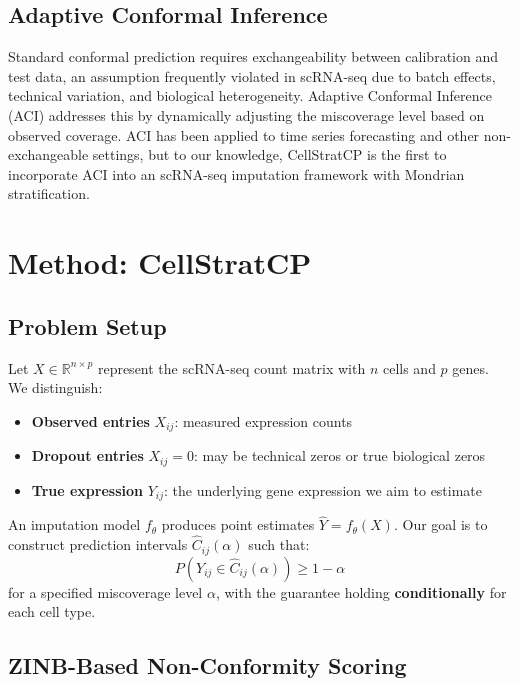 \documentclass{article}
\begin{document}
\subsection{Adaptive Conformal Inference}

Standard conformal prediction requires exchangeability between calibration and test data, an assumption frequently violated in scRNA-seq due to batch effects, technical variation, and biological heterogeneity. Adaptive Conformal Inference (ACI) \citep{gibbs2021adaptive} addresses this by dynamically adjusting the miscoverage level based on observed coverage. ACI has been applied to time series forecasting and other non-exchangeable settings, but to our knowledge, CellStratCP is the first to incorporate ACI into an scRNA-seq imputation framework with Mondrian stratification.

\section{Method: CellStratCP}

\subsection{Problem Setup}

Let $X \in \mathbb{R}^{n \times p}$ represent the scRNA-seq count matrix with $n$ cells and $p$ genes. We distinguish:
\begin{itemize}
    \item \textbf{Observed entries} $X_{ij}$: measured expression counts
    \item \textbf{Dropout entries} $X_{ij} = 0$: may be technical zeros or true biological zeros
    \item \textbf{True expression} $Y_{ij}$: the underlying gene expression we aim to estimate
\end{itemize}

An imputation model $f_\theta$ produces point estimates $\hat{Y} = f_\theta(X)$. Our goal is to construct prediction intervals $\hat{C}_{ij}(\alpha)$ such that:
\begin{equation}
    P(Y_{ij} \in \hat{C}_{ij}(\alpha)) \geq 1 - \alpha
\end{equation}
for a specified miscoverage level $\alpha$, with the guarantee holding \textbf{conditionally} for each cell type.

\subsection{ZINB-Based Non-Conformity Scoring}
\end{document}
